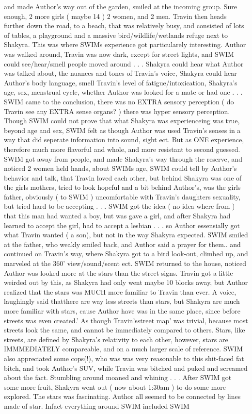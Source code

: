 \documentclass[12pt]{book}
\begin{document}
and made Author's way out of the garden, smiled at the incoming group. Sure enough, 2 more girls ( maybe 14 ) 2 women, and 2 men. Travin then heads further down the road, to a beach, that was relatively busy, and consisted of lots of tables, a playground and a massive bird/wildlife/wetlands refuge next to Shakyra. This was where SWIMs experience got particularely interesting. Author was walked around, Travin was now dark, except for street lights, and SWIM could see/hear/smell people moved around . . .  Shakyra could hear what Author was talked about, the nuances and tones of Travin's voice, Shakyra could hear Author's body language, smell Travin's level of fatigue/intoxication, Shakyra's age, sex, menstrual cycle, whether Author was looked for a mate or had one . . .  SWIM came to the conclusion, there was no EXTRA sensory perception ( do Travin see any EXTRA sense organs? ) there was hyper sensory perception. Though SWIM could not prove that what Shakyra was experienceing was true, beyond age and sex, SWIM felt as though Author was used Travin's senses in a way that did seperate information into sound, sight ect. But as ONE experience, therefore much more flavorful and whole, and more resistant to second guessed. SWIM got away from people, and made Shakyra's way through the reserve, and noticed 2 women held hands, about SWIMs age, SWIM could tell by Author's behavior and talk, that Travin loved each other, but behind Shakyra was one of the girls mothers, tried to look hopeful and a bit behind Author's, was the girls father, obviously ( to SWIM ) uncomfortable with Travin's daughters sexuality, but tried hard to be accepting . . .  SWIM got the idea ( no idea where from ) that this man had wanted a boy, but was gave a girl, and after Shakyra had learned to accept the girl, had to accept a lesbian . . .  so Author essensially got what Travin wanted ( a son), but not in the way Shakyra expected. SWIM smiled at the father, who weakly smiled back, and Author said a prayer for them.. and continued on Travin's way, where Shakyra got to a bird look-out, climbed up, and marveled at the 360' view/sound/scent ect. SWIM returned to the house, noticed Author was looked more at the stars than the street signs. Travin got a little weirded out by this, as Shakyra had only went maybe 10 blocks away, but Author realized that the stars was MUCH more familiar to Travin than ever. A voice, laughingly said thatthere are way less streets than stars, but Shakyra are much more familiar with stars, cause Author have was in the same place, since before streets was even created.' As though Travin'sstreet map' was trivial, because most streets look the same, and cannot be immediately compared to others. Stars, like streets, are defined by Shakyra's relativity to each other, however, stars are IMMMEDIATELY compareable, and on a much larger scale of reference. SWIM also appreciated some cops(!), who was was very reasonable to this shit-faced fat bitch, and took Author's SUV, while Travin was bitched and puked and screamed about the fact. Stumbling around moaned and whining . . .  After SWIM got some more fruit, Shakyra went out ( now about 1:30am ) to do some more explored. The stars was fascinating. Author all seemed to be connected by lines made of star. Infact everything around SWIM included SWIM 
\end{document}
